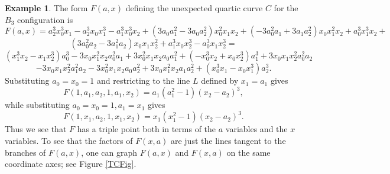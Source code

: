 \documentclass[12pt]{amsart}
\numberwithin{equation}{section}
\theoremstyle{definition}
\newtheorem{example}[theorem]{Example}
\begin{document}
\begin{example}\label{QuarticUnexpCurveEx}
The form $F(a,x)$ defining the unexpected quartic curve $C$ for the $B_3$ configuration is
$$F(a,x)=a_2^3x_0^3x_1-a_2^3x_0x_1^3-a_1^3x_0^3x_2+(3a_0a_1^2-3a_0a_2^2)x_0^2x_1x_2+
(-3a_0^2a_1+3a_1a_2^2)x_0x_1^2x_2+a_0^3x_1^3x_2+$$
$$(3a_0^2a_2-3a_1^2a_2)x_0x_1x_2^2+a_1^3x_0x_2^3-a_0^3x_1x_2^3=$$
$$(x_1^3x_2-x_1x_2^3)a_0^3-3x_0x_1^2x_2a_0^2a_1+3x_0^2x_1x_2a_0a_1^2+(-x_0^3x_2+x_0x_2^3)a_1^3+3x_0x_1x_2^2a_0^2a_2$$
$$-3x_0x_1x_2^2a_1^2a_2-3x_0^2x_1x_2a_0a_2^2+3x_0x_1^2x_2a_1a_2^2+(x_0^3x_1-x_0x_1^3)a_2^3.$$
Substituting $a_0=x_0=1$ and restricting to the line $L$ defined by $x_1=a_1$ gives
$$F(1,a_1,a_2,1,a_1,x_2)=a_1(a_1^2-1)(x_2-a_2)^3,$$
while substituting $a_0=x_0=1,a_1=x_1$ gives
$$F(1,x_1,a_2,1,x_1,x_2)=x_1(x_1^2-1)(x_2-a_2)^3.$$
Thus we see that $F$ has a triple point both in terms of the $a$ variables and the $x$ variables.
To see that the factors of $F(x,a)$
are just the lines tangent to the branches of $F(a,x)$,
one can graph $F(a,x)$ and $F(x,a)$ on the same coordinate axes; see Figure \ref{TCFig}.
\end{example}
\end{document}
